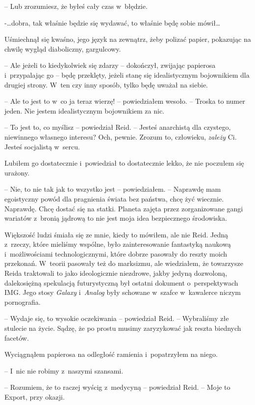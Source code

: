 \documentclass[oneside,polish,11pt,sfheadings]{mwbk}
\begin{document}
-- Lub zrozumiesz, że byłeś cały czas w~błędzie.

-\ldots dobra, tak właśnie będzie się wydawać, to właśnie będę sobie
mówił\ldots

Uśmiechnął się kwaśno, jego język na zewnątrz, żeby polizać papier,
pokazując na chwilę wygląd diaboliczny, gargulcowy. 

-- Ale jeżeli to
kiedykolwiek się zdarzy -- dokończył, zwijając papierosa i~przypalając go
-- będę przeklęty, jeżeli stanę się idealistycznym bojownikiem dla
drugiej strony. W~ten czy inny sposób, tylko będę uważał na siebie.

-- Ale to jest to w~co ja teraz wierzę! -- powiedziałem wesoło. -- Troska
to numer jeden. Nie jestem idealistycznym bojownikiem za nic.

-- To jest to, co myślisz -- powiedział Reid. -- Jesteś anarchistą dla
czystego, niewinnego własnego interesu? Och, pewnie. Zrozum to,
człowieku, \emph{zależy} Ci. Jesteś socjalistą w~sercu.

Lubiłem go dostatecznie i~powiedział to dostatecznie lekko, że nie
poczułem się urażony.

-- Nie, to nie tak jak to wszystko jest -- powiedziałem. -- Naprawdę mam
egoistyczny powód dla pragnienia świata bez państwa, chcę żyć wiecznie.
Naprawdę. Chcę dostać się na statki. Planeta zajęta przez zorganizowane
gangi wariatów z~bronią jądrową to nie jest moja idea bezpiecznego
środowiska.

Większość ludzi śmiała się ze mnie, kiedy to mówiłem, ale nie Reid.
Jedną z~rzeczy, które mieliśmy wspólne, było zainteresowanie fantastyką
naukową i~możliwościami technologicznymi, które dobrze pasowały do
reszty moich przekonań. W~teorii pasowały też do marksizmu, ale
wiedziałem, że towarzysze Reida traktowali to jako ideologicznie
niezdrowe, jakby jedyną dozwoloną, dalekosiężną spekulacją futurystyczną
był ostatni dokument o~perspektywach IMG. Jego stosy \emph{Galaxy} i~\emph{Analog} były schowane w~szafce w~kawalerce niczym pornografia.

-- Wydaje się, to wysokie oczekiwania -- powiedział Reid. -- Wybraliśmy złe
stulecie na życie. Sądzę, że po prostu musimy zaryzykować jak reszta
biednych facetów.

Wyciągnąłem papierosa na odległość ramienia i~popatrzyłem na niego. 

-- I~nic nie robimy z~naszymi szansami.

-- Rozumiem, że to raczej wyścig z~medycyną -- powiedział Reid. -- Moje to
Export, przy okazji.
\end{document}

